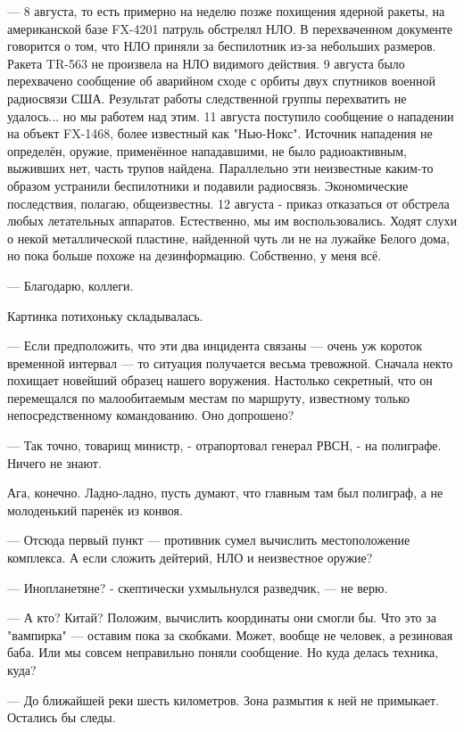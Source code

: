--- 8 августа, то есть примерно на неделю позже похищения ядерной ракеты, на американской базе FX-4201 патруль обстрелял НЛО. В перехваченном документе говорится о том, что НЛО приняли за беспилотник из-за небольших размеров. Ракета TR-563 не произвела на НЛО видимого действия.
9 августа было перехвачено сообщение об аварийном сходе с орбиты двух спутников военной радиосвязи США. Результат работы следственной группы перехватить не удалось... но мы работем над этим.
11 августа поступило сообщение о нападении на объект FX-1468, более известный как "Нью-Нокс". Источник нападения не определён, оружие, применённое нападавшими, не было радиоактивным, выживших нет, часть трупов найдена. Параллельно эти неизвестные каким-то образом устранили беспилотники и подавили радиосвязь. Экономические последствия, полагаю, общеизвестны.
12 августа - приказ отказаться от обстрела любых летательных аппаратов. Естественно, мы им воспользовались.
Ходят слухи о некой металлической пластине, найденной чуть ли не на лужайке Белого дома, но пока больше похоже на дезинформацию.
Собственно, у меня всё.


--- Благодарю, коллеги.

Картинка потихоньку складывалась.

--- Если предположить, что эти два инцидента связаны --- очень уж короток временной интервал ---
то ситуация получается весьма тревожной. Сначала некто похищает новейший образец нашего воружения.
Настолько секретный, что он перемещался по малообитаемым местам по маршруту, известному только непосредственному командованию.
Оно допрошено?

--- Так точно, товарищ министр, - отрапортовал генерал РВСН, - на полиграфе. Ничего не знают.

Ага, конечно. Ладно-ладно, пусть думают, что главным там был полиграф, а не молоденький паренёк из конвоя.

--- Отсюда первый пункт --- противник сумел вычислить местоположение комплекса.
А если сложить дейтерий, НЛО и неизвестное оружие?

--- Инопланетяне? - скептически ухмыльнулся разведчик, --- не верю.

--- А кто? Китай? Положим, вычислить координаты они смогли бы. Что это за "вампирка" --- оставим пока за скобками.
Может, вообще не человек, а резиновая баба. Или мы совсем неправильно поняли сообщение. Но куда делась техника, куда?

--- До ближайшей реки шесть километров. Зона размытия к ней не примыкает. Остались бы следы.

